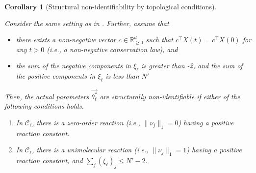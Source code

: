 \documentclass[pdflatex,sn-mathphys-num]{sn-jnl}%
\theoremstyle{thmstyleone}%
\newtheorem{corollary}[theorem]{Corollary}
\theoremstyle{thmstyletwo}%
\theoremstyle{thmstylethree}%
\begin{document}
\begin{corollary}[Structural non-identifiability by topological conditions] \label{corollary structural non-identifiability by topological conditions}

    Consider the same setting as in .
    Further, assume that
    \begin{itemize}[label=$-$]
        \item  there exists a non-negative vector $c\in\mathbb R^{d}_{\geq0}$ such that $c^{\top} X(t) = c^{\top} X(0)$ for any $t>0$ (i.e., a non-negative conservation law), and
        \item the sum of the negative components in $\xi_\ell$ is greater than -2, and the sum of the positive components in $\xi_\ell$ is less than $N'$
    \end{itemize}
    Then, the actual parameters $\overrightarrow {\theta^*_\ell}$ are structurally non-identifiable if either of the following conditions holds.
    \begin{enumerate}
        \item[(1)] In $\mathcal C_\ell$, there is a zero-order reaction (i.e., $\|\nu_j\|_1=0$) having a positive reaction constant.
        
        \item[(2)] In $\mathcal C_\ell$, there is a unimolecular reaction (i.e., $\|\nu_j\|_1=1$) having a positive reaction constant, and $\sum_{j} (\xi_\ell)_j \leq N'-2$. 
    \end{enumerate}
\end{corollary}
\end{document}
